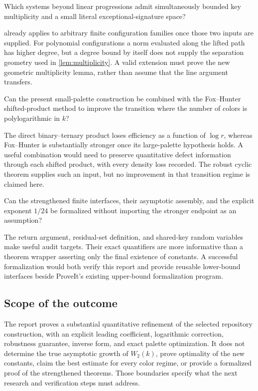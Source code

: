 \begin{question}\label{q:patterns}
Which systems beyond linear progressions admit simultaneously
bounded key multiplicity and a small literal exceptional-signature
space?
\end{question}

 already applies to arbitrary finite configuration
families once those two inputs are supplied.
For polynomial configurations a norm evaluated along the lifted path
has higher degree, but a degree bound by itself does not supply the
separation geometry used in \cref{lem:multiplicity}.
A valid extension must prove the new geometric multiplicity lemma,
rather than assume that the line argument transfers.

\begin{question}\label{q:palettes}
Can the present small-palette construction be combined with the
Fox--Hunter shifted-product method to improve the transition where
the number of colors is polylogarithmic in \(k\)?
\end{question}

The direct binary--ternary product loses efficiency as a function of
\(\log r\), whereas Fox--Hunter is substantially stronger once its
large-palette hypothesis holds.
A useful combination would need to preserve quantitative defect
information through each shifted product, with every density loss
recorded. The robust cyclic theorem supplies such an input, but no
improvement in that transition regime is claimed here.

\begin{question}
\label{q:formal}
Can the strengthened finite interfaces, their asymptotic assembly,
and the explicit exponent \(1/24\) be formalized without importing
the stronger endpoint as an assumption?
\end{question}

The return argument, residual-set definition, and shared-key random
variables make useful audit targets.
Their exact quantifiers are more informative than a theorem wrapper
asserting only the final existence of constants.
A successful formalization would both verify this report and provide
reusable lower-bound interfaces beside ProveIt's existing
upper-bound formalization program.

\subsection{Scope of the outcome}

The report proves a substantial quantitative refinement of the selected
repository construction, with an explicit leading coefficient,
logarithmic correction, robustness guarantee, inverse form, and exact
palette optimization.
It does not determine the true asymptotic growth of \(W_2(k)\), prove
optimality of the new constants, claim the best estimate for every
color regime, or provide a formalized proof of the strengthened
theorems. Those boundaries specify what the next research and
verification steps must address.

